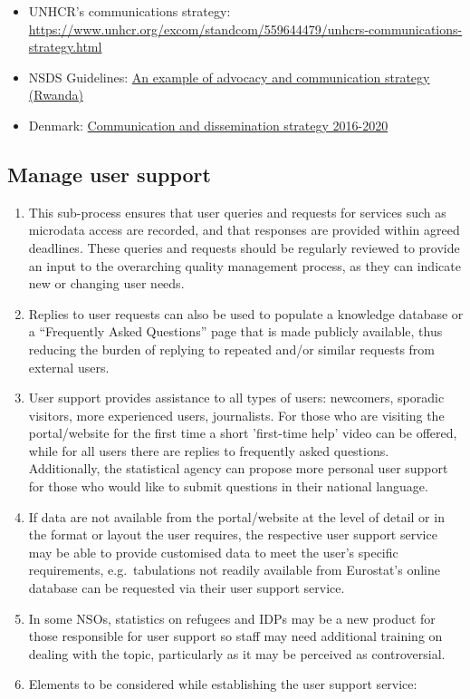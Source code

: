 \documentclass[
]{article}
\begin{document}
\begin{itemize}
\item
  UNHCR's communications strategy{:}
  \url{https://www.unhcr.org/excom/standcom/559644479/unhcrs-communications-strategy.html}
\item
  NSDS Guidelines: \href{https://nsdsguidelines.paris21.org/node/808}{An example of advocacy and communication strategy
  (Rwanda)}
\item
  Denmark: \href{https://www.dst.dk/Site/Dst/Udgivelser/GetPubFile.aspx?id=27490\&sid=comdis2016-2020}{Communication and dissemination strategy
  2016-2020}
\end{itemize}

\hypertarget{manage-user-support-1}{%
\subsection{Manage user support}\label{manage-user-support-1}}

\begin{enumerate}
\def\labelenumi{\arabic{enumi}.}
\setcounter{enumi}{530}
\item
  This sub-process ensures that user queries and requests for
  services such as microdata access are recorded, and that responses
  are provided within agreed deadlines. These queries and requests
  should be regularly reviewed to provide an input to the overarching
  quality management process, as they can indicate new or changing
  user needs.
\item
  Replies to user requests can also be used to populate a knowledge
  database or a ``Frequently Asked Questions'' page that is made
  publicly available, thus reducing the burden of replying to repeated
  and/or similar requests from external users.
\item
  User support provides assistance to all types of users: newcomers,
  sporadic visitors, more experienced users, journalists. For those
  who are visiting the portal/website for the first time a short
  'first-time help' video can be offered, while for all users there
  are replies to frequently asked questions. Additionally, the
  statistical agency can propose more personal user support for those
  who would like to submit questions in their national language.
\item
  If data are not available from the portal/website at the level of
  detail or in the format or layout the user requires, the respective
  user support service may be able to provide customised data to meet
  the user's specific requirements, e.g.~tabulations not readily
  available from Eurostat's online database can be requested via
  their user support service.
\item
  In some NSOs, statistics on refugees and IDPs may be a new product
  for those responsible for user support so staff may need additional
  training on dealing with the topic, particularly as it may be
  perceived as controversial.
\item
  Elements to be considered while establishing the user support
  service:
\end{enumerate}
\end{document}
